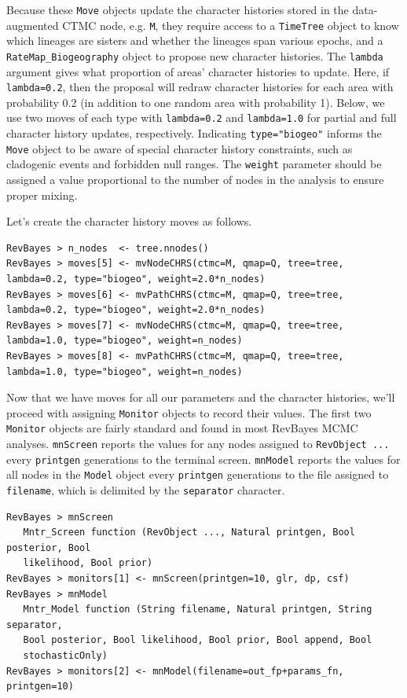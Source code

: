 \documentclass[11pt]{article}
\begin{document}
Because these {\tt Move} objects update the character histories stored in the data-augmented CTMC node, e.g. {\tt M},
they require access to a {\tt TimeTree} object to know which lineages are sisters and whether the lineages span various epochs, and a {\tt RateMap\_Biogeography} object to propose new character histories.
The {\tt lambda} argument gives what proportion of areas' character histories to update.
Here, if {\tt lambda=0.2}, then the proposal will redraw character histories for each area with probability 0.2 (in addition to one random area with probability 1).
Below, we use two moves of each type with {\tt lambda=0.2} and {\tt lambda=1.0} for partial and full character history updates, respectively.
Indicating {\tt type="biogeo"} informs the {\tt Move} object to be aware of special character history constraints, such as cladogenic events and forbidden null ranges.
The {\tt weight} parameter should be assigned a value proportional to the number of nodes in the analysis to ensure proper mixing.

Let's create the character history moves as follows.

\begin{snugshade}
\begin{lstlisting}
RevBayes > n_nodes  <- tree.nnodes()
RevBayes > moves[5] <- mvNodeCHRS(ctmc=M, qmap=Q, tree=tree, lambda=0.2, type="biogeo", weight=2.0*n_nodes)
RevBayes > moves[6] <- mvPathCHRS(ctmc=M, qmap=Q, tree=tree, lambda=0.2, type="biogeo", weight=2.0*n_nodes)
RevBayes > moves[7] <- mvNodeCHRS(ctmc=M, qmap=Q, tree=tree, lambda=1.0, type="biogeo", weight=n_nodes)
RevBayes > moves[8] <- mvPathCHRS(ctmc=M, qmap=Q, tree=tree, lambda=1.0, type="biogeo", weight=n_nodes)
\end{lstlisting}
\end{snugshade}

Now that we have moves for all our parameters and the character histories, we'll proceed with assigning {\tt Monitor} objects to record their values.
The first two {\tt Monitor} objects are fairly standard and found in most RevBayes MCMC analyses.
{\tt mnScreen} reports the values for any nodes assigned to {\tt RevObject ...} every {\tt printgen} generations to the terminal screen.
{\tt mnModel} reports the values for all nodes in the {\tt Model} object every {\tt printgen} generations to the file assigned to {\tt filename}, which is delimited by the {\tt separator} character.

\begin{snugshade}
\begin{lstlisting}
RevBayes > mnScreen
   Mntr_Screen function (RevObject ..., Natural printgen, Bool posterior, Bool
   likelihood, Bool prior)
RevBayes > monitors[1] <- mnScreen(printgen=10, glr, dp, csf)
RevBayes > mnModel
   Mntr_Model function (String filename, Natural printgen, String separator,
   Bool posterior, Bool likelihood, Bool prior, Bool append, Bool
   stochasticOnly)
RevBayes > monitors[2] <- mnModel(filename=out_fp+params_fn, printgen=10)
\end{lstlisting}
\end{snugshade}
\end{document}
